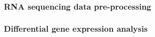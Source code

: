 \subsubsection{RNA sequencing data pre-processing}


\subsubsection{Differential gene expression analysis}

